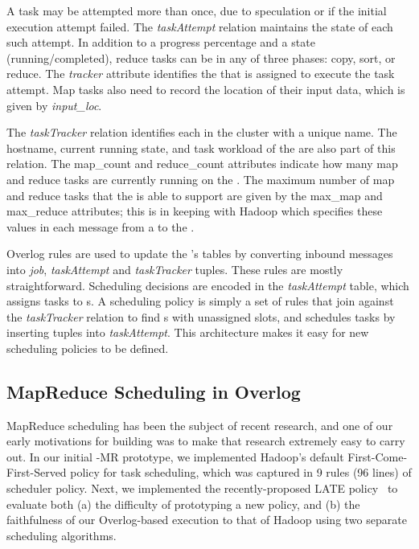 A task may be attempted more than once, due to speculation or if the initial
execution attempt failed.  The \emph{taskAttempt} relation maintains the state
of each such attempt.  In addition to a progress percentage and a state
(running/completed), reduce tasks can be in any of three phases: copy, sort, or
reduce. The \emph{tracker} attribute identifies the {\TT} that is assigned to
execute the task attempt. Map tasks also need to record the location of their
input data, which is given by \emph{input\_loc}. 

The \emph{taskTracker} relation identifies each {\TT} in the cluster with a unique name.
The hostname, current running state, and task workload of the \TT are also part of this relation. 
The map\_count and reduce\_count attributes indicate how many map and reduce tasks are currently 
running on the \TT. The maximum number of map and reduce tasks that the \TT is able to support are 
given by the max\_map and max\_reduce attributes; this is in keeping with Hadoop which specifies 
these values in each message from a \TT to the \JT. 

Overlog rules are used to update the {\JT}'s tables by converting inbound messages
into \emph{job}, \emph{taskAttempt} and \emph{taskTracker} tuples. These rules
are mostly straightforward. Scheduling decisions are encoded in the
\emph{taskAttempt} table, which assigns tasks to {\TT}s. A scheduling policy is
simply a set of rules that join against the \emph{taskTracker} relation to find
\TT{}s with unassigned slots, and schedules tasks by inserting tuples into
\emph{taskAttempt}. This architecture makes it easy for new scheduling policies
to be defined.

\subsection{MapReduce Scheduling in Overlog}

MapReduce scheduling has been the subject of recent research, and one
of our early motivations for building \BOOMA was to make that research
extremely easy to carry out. In our initial \BOOM-MR prototype, we
implemented Hadoop's default First-Come-First-Served policy for task
scheduling, which was captured in 9 rules (96 lines) of scheduler
policy. Next, we implemented the recently-proposed LATE
policy~\cite{late-sched} to evaluate both (a) the difficulty of
prototyping a new policy, and (b) the faithfulness of our
Overlog-based execution to that of Hadoop using two separate
scheduling algorithms.


